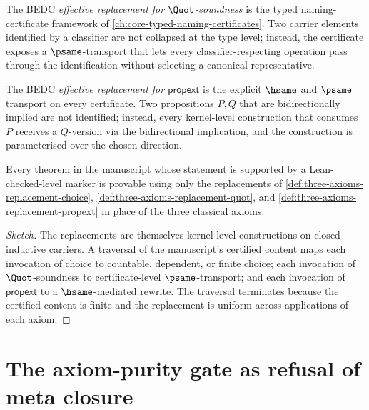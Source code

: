 \begin{definition}
\label{def:three-axioms-replacement-quot}
The BEDC \emph{effective replacement for $\Quot$-soundness} is the typed naming-certificate framework of \autoref{ch:core-typed-naming-certificates}. Two carrier elements identified by a classifier are not collapsed at the type level; instead, the certificate exposes a $\psame$-transport that lets every classifier-respecting operation pass through the identification without selecting a canonical representative.
\end{definition}

\begin{definition}
\label{def:three-axioms-replacement-propext}
The BEDC \emph{effective replacement for $\mathsf{propext}$} is the explicit $\hsame$ and $\psame$ transport on every certificate. Two propositions $P, Q$ that are bidirectionally implied are not identified; instead, every kernel-level construction that consumes $P$ receives a $Q$-version via the bidirectional implication, and the construction is parameterised over the chosen direction.
\end{definition}

\begin{theorem}
\label{thm:three-axioms-replacements-suffice}
Every theorem in the manuscript whose statement is supported by a Lean-checked-level marker is provable using only the replacements of \autoref{def:three-axioms-replacement-choice}, \autoref{def:three-axioms-replacement-quot}, and \autoref{def:three-axioms-replacement-propext} in place of the three classical axioms.
\end{theorem}

\begin{proof}[Sketch]
The replacements are themselves kernel-level constructions on closed inductive carriers. A traversal of the manuscript's certified content maps each invocation of choice to countable, dependent, or finite choice; each invocation of $\Quot$-soundness to certificate-level $\psame$-transport; and each invocation of $\mathsf{propext}$ to a $\hsame$-mediated rewrite. The traversal terminates because the certified content is finite and the replacement is uniform across applications of each axiom.
\end{proof}

\section{The axiom-purity gate as refusal of meta closure}
\label{sec:three-axioms-purity-gate}

